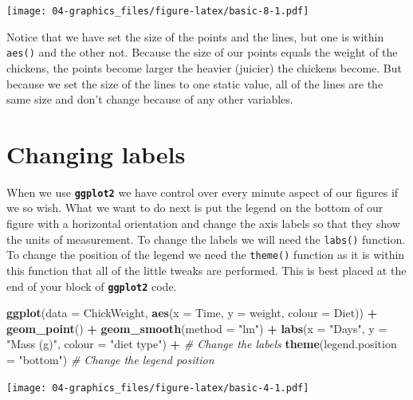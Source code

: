 \documentclass[]{book}
\newenvironment{Shaded}{\begin{snugshade}}{\end{snugshade}}
\newcommand{\KeywordTok}[1]{\textcolor[rgb]{0.13,0.29,0.53}{\textbf{#1}}}
\newcommand{\DataTypeTok}[1]{\textcolor[rgb]{0.13,0.29,0.53}{#1}}
\newcommand{\StringTok}[1]{\textcolor[rgb]{0.31,0.60,0.02}{#1}}
\newcommand{\CommentTok}[1]{\textcolor[rgb]{0.56,0.35,0.01}{\textit{#1}}}
\newcommand{\OperatorTok}[1]{\textcolor[rgb]{0.81,0.36,0.00}{\textbf{#1}}}
\newcommand{\NormalTok}[1]{#1}
\theoremstyle{definition}
\theoremstyle{definition}
\theoremstyle{definition}
\theoremstyle{remark}
\begin{document}
\texttt{[image: 04-graphics\_files/figure-latex/basic-8-1.pdf]}

Notice that we have set the size of the points and the lines, but one is
within \texttt{aes()} and the other not. Because the size of our points
equals the weight of the chickens, the points become larger the heavier
(juicier) the chickens become. But because we set the size of the lines
to one static value, all of the lines are the same size and don't change
because of any other variables.

\section{Changing labels}\label{changing-labels}

When we use \textbf{\texttt{ggplot2}} we have control over every minute
aspect of our figures if we so wish. What we want to do next is put the
legend on the bottom of our figure with a horizontal orientation and
change the axis labels so that they show the units of measurement. To
change the labels we will need the \texttt{labs()} function. To change
the position of the legend we need the \texttt{theme()} function as it
is within this function that all of the little tweaks are performed.
This is best placed at the end of your block of
\textbf{\texttt{ggplot2}} code.

\begin{Shaded}
\begin{Highlighting}[]
\KeywordTok{ggplot}\NormalTok{(}\DataTypeTok{data =}\NormalTok{ ChickWeight, }\KeywordTok{aes}\NormalTok{(}\DataTypeTok{x =}\NormalTok{ Time, }\DataTypeTok{y =}\NormalTok{ weight, }\DataTypeTok{colour =}\NormalTok{ Diet)) }\OperatorTok{+}
\StringTok{  }\KeywordTok{geom_point}\NormalTok{() }\OperatorTok{+}
\StringTok{  }\KeywordTok{geom_smooth}\NormalTok{(}\DataTypeTok{method =} \StringTok{"lm"}\NormalTok{) }\OperatorTok{+}
\StringTok{  }\KeywordTok{labs}\NormalTok{(}\DataTypeTok{x =} \StringTok{"Days"}\NormalTok{, }\DataTypeTok{y =} \StringTok{"Mass (g)"}\NormalTok{, }\DataTypeTok{colour =} \StringTok{"diet type"}\NormalTok{) }\OperatorTok{+}\StringTok{ }\CommentTok{# Change the labels}
\StringTok{  }\KeywordTok{theme}\NormalTok{(}\DataTypeTok{legend.position =} \StringTok{"bottom"}\NormalTok{) }\CommentTok{# Change the legend position}
\end{Highlighting}
\end{Shaded}

\texttt{[image: 04-graphics\_files/figure-latex/basic-4-1.pdf]}
\end{document}
